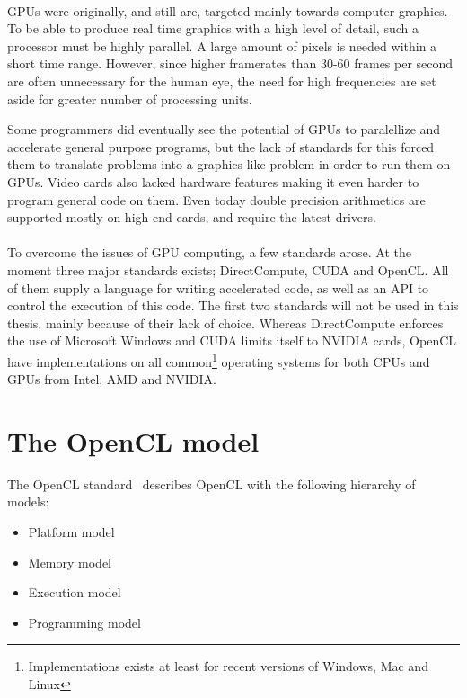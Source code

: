 \paragraph*{}
GPUs were originally, and still are, targeted mainly towards computer graphics.
To be able to produce real time graphics with a high level of detail, such a processor must be highly parallel.
A large amount of pixels is needed within a short time range.
However, since higher framerates than 30-60 frames per second are often unnecessary for the human eye, the need for high frequencies are set aside for greater number of processing units.

Some programmers did eventually see the potential of GPUs to paralellize and accelerate general purpose programs, but the lack of standards for this forced them to translate problems into a graphics-like problem in order to run them on GPUs.
Video cards also lacked hardware features making it even harder to program general code on them.
Even today double precision arithmetics are supported mostly on high-end cards, and require the latest drivers.

\paragraph*{}
To overcome the issues of GPU computing, a few standards arose.
At the moment three major standards exists; DirectCompute, CUDA and OpenCL.
All of them supply a language for writing accelerated code, as well as an API to control the execution of this code.
The first two standards will not be used in this thesis, mainly because of their lack of choice.
Whereas DirectCompute enforces the use of Microsoft Windows and CUDA limits itself to NVIDIA cards, OpenCL have implementations on all common\footnote{Implementations exists at least for recent versions of Windows, Mac and Linux} operating systems for both CPUs and GPUs from Intel, AMD and NVIDIA.



\section{The OpenCL model}
The OpenCL standard~\cite{openclspec} describes OpenCL with the following hierarchy of models:
\begin{itemize}
\item Platform model
\item Memory model
\item Execution model
\item Programming model
\end{itemize}


